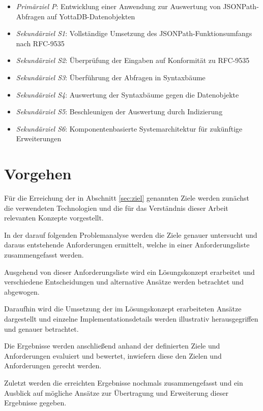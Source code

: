 \documentclass[oneside]{ausarbeitung}
\begin{document}
\begin{itemize}
	\item \textit{Primärziel P}: Entwicklung einer Anwendung zur Auswertung von JSONPath-Abfragen auf YottaDB-Datenobjekten
	\item \textit{Sekundärziel S1}: Vollständige Umsetzung des JSONPath-Funktionsumfangs nach RFC-9535
	\item \textit{Sekundärziel S2}: Überprüfung der Eingaben auf Konformität zu RFC-9535 
	\item \textit{Sekundärziel S3}: Überführung der Abfragen in Syntaxbäume
	\item \textit{Sekundärziel S4}: Auswertung der Syntaxbäume gegen die Datenobjekte
	\item \textit{Sekundärziel S5}: Beschleunigen der Auswertung durch Indizierung
	\item \textit{Sekundärziel S6}: Komponentenbasierte Systemarchitektur für zukünftige Erweiterungen
\end{itemize}





\section{Vorgehen}
\label{sec:vorgehen}

Für die Erreichung der in Abschnitt \ref{sec:ziel} genannten Ziele werden zunächst die verwendeten Technologien und die für das Verständnis dieser Arbeit relevanten Konzepte vorgestellt. 
	
In der darauf folgenden Problemanalyse werden die Ziele genauer untersucht und daraus entstehende Anforderungen ermittelt, welche in einer Anforderungsliste zusammengefasst werden.

\pagebreak
	
Ausgehend von dieser Anforderungsliste wird ein Lösungskonzept erarbeitet und verschiedene Entscheidungen und alternative Ansätze werden betrachtet und abgewogen.
	
Daraufhin wird die Umsetzung der im Lösungskonzept erarbeiteten Ansätze dargestellt und einzelne Implementationsdetails werden illustrativ herausgegriffen und genauer betrachtet.
	
Die Ergebnisse werden anschließend anhand der definierten Ziele und Anforderungen evaluiert und bewertet, inwiefern diese den Zielen und Anforderungen gerecht werden.
	
Zuletzt werden die erreichten Ergebnisse nochmals zusammengefasst und ein Ausblick auf mögliche Ansätze zur Übertragung und Erweiterung dieser Ergebnisse gegeben.
\end{document}

